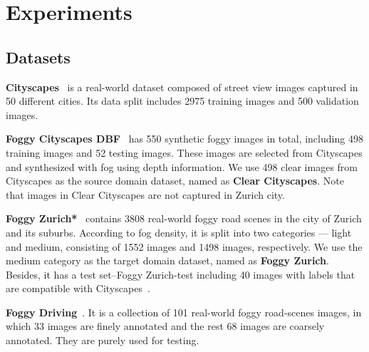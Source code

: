 \documentclass[10pt,twocolumn,letterpaper]{article}
\begin{document}
\section{Experiments}
\subsection{Datasets}
\noindent\textbf{Cityscapes}~\cite{marius2016cityscapes} is a real-world dataset composed of street view images captured in 50 different cities. Its data split includes 2975 training images and 500 validation images.


\noindent\textbf{Foggy Cityscapes DBF}~\cite{sakaridis2018semantic} has 550 synthetic foggy images in total, including 498 training images and 52 testing images. These images are selected from Cityscapes and synthesized with fog using depth information. We use 498 clear images from Cityscapes as the source domain dataset, named as \textbf{Clear Cityscapes}. Note that images in Clear Cityscapes are not captured in Zurich city.
    
\noindent\textbf{Foggy Zurich*}~\cite{sakaridis2018model} contains 3808 real-world foggy road scenes in the city of Zurich and its suburbs. 
According to fog density, it is split into two categories --- light and medium, consisting of 1552 images and 1498 images, respectively. We use the medium category as the target domain dataset, named as \textbf{Foggy Zurich}. Besides, it has a test set--Foggy Zurich-test including 40 images with labels that are compatible with Cityscapes~\cite{marius2016cityscapes}.

\noindent\textbf{Foggy Driving}~\cite{sakaridis2018model}. It is a collection of 101 real-world foggy road-scenes images, in which 33 images are finely annotated and the rest 68 images are coarsely annotated. They are purely used for testing. 
    
\end{document}
